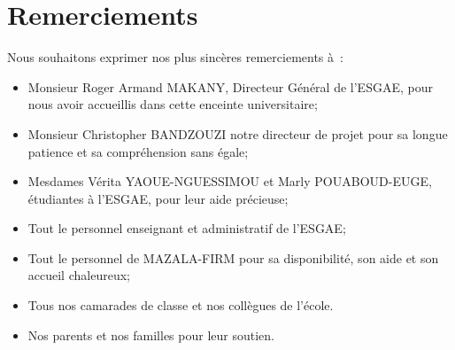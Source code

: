 \chapter*{Remerciements}

Nous souhaitons exprimer nos plus sincères remerciements à :

\begin{itemize}
  \item Monsieur Roger Armand MAKANY, Directeur Général de l’ESGAE,
      pour nous avoir accueillis dans cette enceinte universitaire;

  \item Monsieur Christopher BANDZOUZI notre directeur de projet pour sa
      longue patience et sa compréhension sans égale;

  \item Mesdames Vérita YAOUE-NGUESSIMOU et Marly POUABOUD-EUGE, étudiantes à l’ESGAE, pour
      leur aide précieuse;

  \item Tout le personnel enseignant et administratif de l’ESGAE;


  \item Tout le personnel de MAZALA-FIRM pour sa disponibilité, son aide et son
      accueil chaleureux;

  \item Tous nos camarades de classe et nos collègues de l’école.

  \item Nos parents et nos familles pour leur soutien.

\end{itemize}
